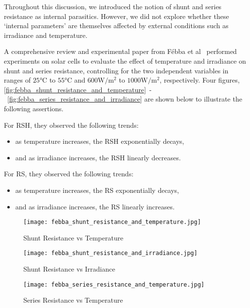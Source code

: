 Throughout this discussion, we introduced the notion of shunt and series
resistance as internal parasitics. However, we did not explore whether these
`internal parameters' are themselves affected by external conditions such as
irradiance and temperature.

A comprehensive review and experimental paper from Fébba et
al~\cite{febba_et_al} performed experiments on solar cells to evaluate the
effect of temperature and irradiance on shunt and series resistance, controlling
for the two independent variables in ranges of $25\si{\celsius}$ to
$55\si{\celsius}$ and $600\si{\watt/\meter^2}$ to $1000\si{\watt/\meter^2}$,
respectively. Four figures,
\autoref{fig:febba_shunt_resistance_and_temperature}~-~\autoref{fig:febba_series_resistance_and_irradiance}
are shown below to illustrate the following assertions.

For \acf{RSH}, they observed the following trends:

\begin{itemize}
    \item as temperature increases, the \ac{RSH} exponentially decays,
    \item and as irradiance increases, the \ac{RSH} linearly decreases.
\end{itemize}

For \ac{RS}, they observed the following trends:

\begin{itemize}
    \item as temperature increases, the \ac{RS} exponentially decays,
    \item and as irradiance increases, the \ac{RS} linearly increases.
\end{itemize}

\begin{figure}[!htbp]
    \centering
    \texttt{[image: febba\_shunt\_resistance\_and\_temperature.jpg]}
    \caption{Shunt Resistance vs Temperature~\cite{febba_et_al}}
    \label{fig:febba_shunt_resistance_and_temperature}
\end{figure}

\begin{figure}[!htbp]
    \centering
    \texttt{[image: febba\_shunt\_resistance\_and\_irradiance.jpg]}
    \caption{Shunt Resistance vs Irradiance~\cite{febba_et_al}}
    \label{fig:febba_shunt_resistance_and_irradiance}
\end{figure}

\begin{figure}[!htbp]
    \centering
    \texttt{[image: febba\_series\_resistance\_and\_temperature.jpg]}
    \caption{Series Resistance vs Temperature~\cite{febba_et_al}}
    \label{fig:febba_series_resistance_and_temperature}
\end{figure}

